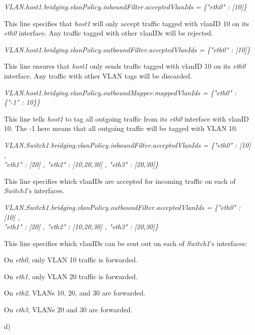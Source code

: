 \documentclass[a4paper]{article}
\begin{document}
	\begin{center}
		\textit{VLAN.host1.bridging.vlanPolicy.inboundFilter.acceptedVlanIds = \{"eth0" : [10]\}}
	\end{center}
	This line specifies that \textit{host1} will only accept traffic tagged with vlanID 10 on its \textit{eth0} interface. Any traffic tagged with other vlanIDs will be rejected.
	
	\begin{center}
		\textit{VLAN.host1.bridging.vlanPolicy.outboundFilter.acceptedVlanIds = \{"eth0" : [10]\}}
	\end{center}
	This line ensures that \textit{host1} only sends traffic tagged with vlanID 10 on its \textit{eth0} interface. Any traffic with other VLAN tags will be discarded.
	
	\pagebreak
	
	\begin{center}
		\textit{VLAN.host1.bridging.vlanPolicy.outboundMapper.mappedVlanIds = \{"eth0" : \{"-1" : 10\}\}}
	\end{center}
	This line tells \textit{host1} to tag all outgoing traffic from its \textit{eth0} interface with vlanID 10. The -1 here means that all outgoing traffic will be tagged with VLAN 10.
	
	\begin{center}
		\textit{VLAN.Switch1.bridging.vlanPolicy.inboundFilter.acceptedVlanIds = \{"eth0" : [10] ,\\ "eth1" : [20] , "eth2" : [10,20,30] , "eth3" : [20,30]\}}
	\end{center}
	This line specifies which vlanIDs are accepted for incoming traffic on each of \textit{Switch1}'s interfaces.
	
	\begin{center}
		\textit{VLAN.Switch1.bridging.vlanPolicy.outboundFilter.acceptedVlanIds = \{"eth0" : [10] ,\\ "eth1" : [20] , "eth2" : [10,20,30] , "eth3" : [20,30]\}}
	\end{center}
	This line specifies which vlanIDs can be sent out on each of \textit{Switch1}'s interfaces:
	
	On \textit{eth0}, only VLAN 10 traffic is forwarded.
	
	On \textit{eth1}, only VLAN 20 traffic is forwarded.
	
	On \textit{eth2}, VLANs 10, 20, and 30 are forwarded.
	
	On \textit{eth3}, VLANs 20 and 30 are forwarded.
	
	\Large
	d)
	\large
	
\end{document}
